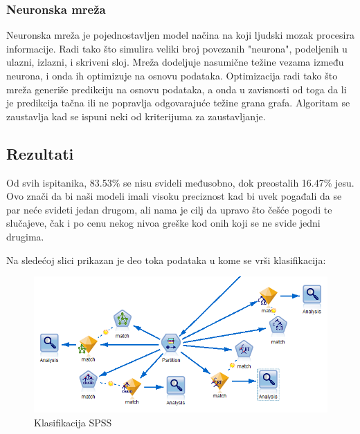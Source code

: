 \documentclass{article}
\begin{document}
\subsubsection{Neuronska mreža}
Neuronska mreža\cite{ibmnn} je pojednostavljen model načina na koji ljudski mozak procesira informacije. Radi tako što simulira veliki broj povezanih "neurona", podeljenih u ulazni, izlazni, i skriveni sloj. Mreža dodeljuje nasumične težine vezama između neurona, i onda ih optimizuje na osnovu podataka. Optimizacija radi tako što mreža generiše predikciju na osnovu podataka, a onda u zavisnosti od toga da li je predikcija tačna ili ne popravlja odgovarajuće težine grana grafa. Algoritam se zaustavlja kad se ispuni neki od kriterijuma za zaustavljanje.\par
\subsection{Rezultati}
Od svih ispitanika, 83.53\% se nisu svideli međusobno, dok preostalih 16.47\% jesu. Ovo znači da bi naši modeli imali visoku preciznost kad bi uvek pogađali da se par neće svideti jedan drugom, ali nama je cilj da upravo što češće pogodi te slučajeve, čak i po cenu nekog nivoa greške kod onih koji se ne svide jedni drugima.\par
Na sledećoj slici prikazan je deo toka podataka u kome se vrši klasifikacija:
\begin{figure}[h!]
\centering
\includegraphics[scale=0.36]{graphics/classification.png}
\caption{Klasifikacija SPSS}
\label{fig:classification}
\end{figure}
\FloatBarrier
\end{document}
